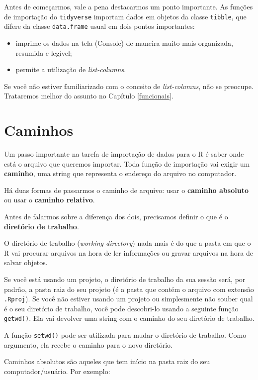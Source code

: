 \documentclass[
]{book}
\begin{document}
Antes de começarmos, vale a pena destacarmos um ponto importante. As funções de importação do \texttt{tidyverse} importam dados em objetos da classe \texttt{tibble}, que difere da classe \texttt{data.frame} usual em dois pontos importantes:

\begin{itemize}
\item
  imprime os dados na tela (Console) de maneira muito mais organizada, resumida e legível;
\item
  permite a utilização de \emph{list-columns}.
\end{itemize}

Se você não estiver familiarizado com o conceito de \emph{list-columns}, não se preocupe. Trataremos melhor do assunto no Capítulo \ref{funcionais}.

\hypertarget{caminhos}{%
\section{Caminhos}\label{caminhos}}

Um passo importante na tarefa de importação de dados para o R é saber onde está o arquivo que queremos importar. Toda função de importação vai exigir um \textbf{caminho}, uma string que representa o endereço do arquivo no computador.

Há duas formas de passarmos o caminho de arquivo: usar o \textbf{caminho absoluto} ou usar o \textbf{caminho relativo}.

Antes de falarmos sobre a diferença dos dois, precisamos definir o que é o \textbf{diretório de trabalho}.

O diretório de trabalho (\emph{working directory}) nada mais é do que a pasta em que o R vai procurar arquivos na hora de ler informações ou gravar arquivos na hora de salvar objetos.

Se você está usando um projeto, o diretório de trabalho da sua sessão será, por padrão, a pasta raiz do seu projeto (é a pasta que contém o arquivo com extensão \texttt{.Rproj}). Se você não estiver usando um projeto ou simplesmente não souber qual é o seu diretório de trabalho, você pode descobri-lo usando a seguinte função \texttt{getwd()}. Ela vai devolver uma string com o caminho do seu diretório de trabalho.

A função \texttt{setwd()} pode ser utilizada para mudar o diretório de trabalho. Como argumento, ela recebe o caminho para o novo diretório.

Caminhos absolutos são aqueles que tem início na pasta raiz do seu computador/usuário. Por exemplo:
\end{document}
